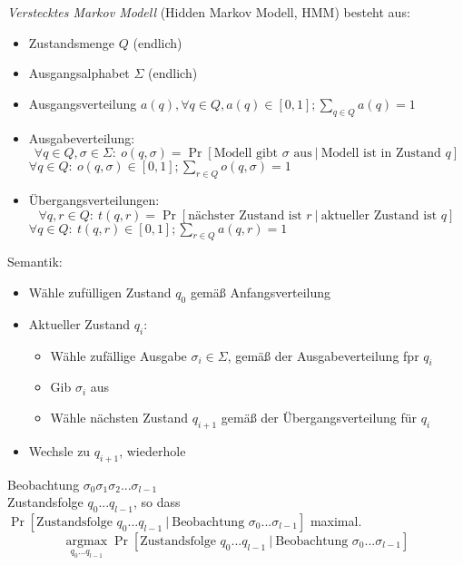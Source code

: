 \Defi \emph{Verstecktes Markov Modell} (Hidden Markov Modell, HMM) besteht aus:
\begin{itemize}
 \item Zustandsmenge $Q$ (endlich)
 \item Ausgangsalphabet $\Sigma$ (endlich)
 \item Ausgangsverteilung $a(q), \forall q \in Q, a(q) \in [0,1]; \sum\limits_{q \in Q} a(q) = 1$
 \item Ausgabeverteilung: 
     \[\forall q \in Q, \sigma \in \Sigma{:}\ o(q,\sigma) = \operatorname{Pr}[\text{Modell gibt $\sigma$ aus}\ |\ \text{Modell ist in Zustand $q$}]\]
     $\forall q \in Q{:}\ o(q,\sigma) \in [0,1]; \sum\limits_{r \in Q} o(q,\sigma) = 1$
 \item Übergangsverteilungen:
     \[\forall q,r \in Q{:}\ t(q,r) = \operatorname{Pr}[\text{nächster Zustand ist $r$}\ |\ \text{aktueller Zustand ist $q$}]\]
     $\forall q \in Q{:}\ t(q,r) \in [0,1]; \sum\limits_{r \in Q} a(q,r) = 1$
\end{itemize}
Semantik:
\begin{itemize}
 \item Wähle zufülligen Zustand $q_0$ gemäß Anfangsverteilung
 \item Aktueller Zustand $q_i$:
     \begin{itemize}
     \item Wähle zufällige Ausgabe $\sigma_i \in \Sigma$, gemäß der Ausgabeverteilung fpr $q_i$
     \item Gib $\sigma_i$ aus
     \item Wähle nächsten Zustand $q_{i+1}$ gemäß der Übergangsverteilung für $q_i$
     \end{itemize}
 \item Wechsle zu $q_{i+1}$, wiederhole
\end{itemize}
\Geg Beobachtung $\sigma_0\sigma_1\sigma_2...\sigma_{l-1}$ \\
\Ges Zustandsfolge $q_0...q_{l-1}$, so dass $\operatorname{Pr}[\text{Zustandsfolge $q_0...q_{l-1}$}\ |\ \text{Beobachtung $\sigma_0...\sigma_{l-1}$}]$ maximal.
\[\underset{q_0...q_{l-1}}{\operatorname{argmax}} \operatorname{Pr}[\text{Zustandsfolge $q_0...q_{l-1}$}\ |\ \text{Beobachtung $\sigma_0...\sigma_{l-1}$}]\]




